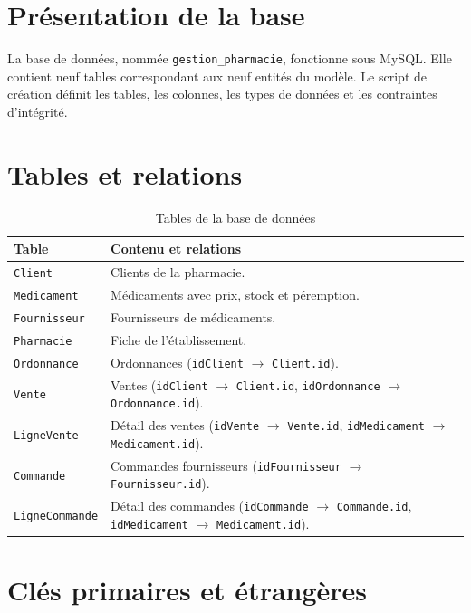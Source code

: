 \documentclass[12pt,a4paper]{report}
\begin{document}
\section{Présentation de la base}

La base de données, nommée \texttt{gestion\_pharmacie}, fonctionne sous MySQL. Elle contient neuf tables correspondant aux neuf entités du modèle. Le script de création définit les tables, les colonnes, les types de données et les contraintes d'intégrité.

\section{Tables et relations}

\begin{table}[H]
\centering
\begin{tabularx}{\textwidth}{lX}
\toprule
\textbf{Table} & \textbf{Contenu et relations} \\
\midrule
\texttt{Client}         & Clients de la pharmacie. \\
\texttt{Medicament}     & Médicaments avec prix, stock et péremption. \\
\texttt{Fournisseur}    & Fournisseurs de médicaments. \\
\texttt{Pharmacie}      & Fiche de l'établissement. \\
\texttt{Ordonnance}     & Ordonnances (\texttt{idClient} $\rightarrow$ \texttt{Client.id}). \\
\texttt{Vente}          & Ventes (\texttt{idClient} $\rightarrow$ \texttt{Client.id}, \texttt{idOrdonnance} $\rightarrow$ \texttt{Ordonnance.id}). \\
\texttt{LigneVente}     & Détail des ventes (\texttt{idVente} $\rightarrow$ \texttt{Vente.id}, \texttt{idMedicament} $\rightarrow$ \texttt{Medicament.id}). \\
\texttt{Commande}       & Commandes fournisseurs (\texttt{idFournisseur} $\rightarrow$ \texttt{Fournisseur.id}). \\
\texttt{LigneCommande}  & Détail des commandes (\texttt{idCommande} $\rightarrow$ \texttt{Commande.id}, \texttt{idMedicament} $\rightarrow$ \texttt{Medicament.id}). \\
\bottomrule
\end{tabularx}
\caption{Tables de la base de données}
\end{table}

\section{Clés primaires et étrangères}
\end{document}
